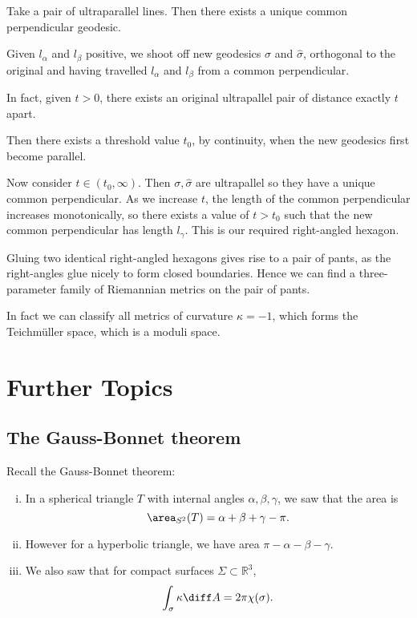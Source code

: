 \documentclass[12pt]{article}
\begin{document}
\begin{proofbox}
	Take a pair of ultraparallel lines. Then there exists a unique common perpendicular geodesic.

	Given $l_\alpha$ and $l_\beta$ positive, we shoot off new geodesics $\sigma$ and $\hat \sigma$, orthogonal to the original and having travelled $l_\alpha$ and $l_\beta$ from a common perpendicular.

	In fact, given $t > 0$, there exists an original ultrapallel pair of distance exactly $t$ apart.

	Then there exists a threshold value $t_0$, by continuity, when the new geodesics first become parallel.

	Now consider $t \in (t_0, \infty)$. Then $\sigma, \hat \sigma$ are ultrapallel so they have a unique common perpendicular. As we increase $t$, the length of the common perpendicular increases monotonically, so there exists a value of $t > t_0$ such that the new common perpendicular has length $l_\gamma$. This is our required right-angled hexagon.
\end{proofbox}

Gluing two identical right-angled hexagons gives rise to a pair of pants, as the right-angles glue nicely to form closed boundaries. Hence we can find a three-parameter family of Riemannian metrics on the pair of pants.

In fact we can classify all metrics of curvature $\kappa = -1$, which forms the Teichm\"{u}ller space, which is a moduli space.


\newpage

\section{Further Topics}
\label{sec:further_topics}

\subsection{The Gauss-Bonnet theorem}
\label{sub:the_gauss_bonnet_theorem}

Recall the Gauss-Bonnet theorem:
\begin{enumerate}[(i)]
	\item In a spherical triangle $T$ with internal angles $\alpha, \beta, \gamma$, we saw that the area is
		\[
			\area_{S^2}(T) = \alpha + \beta + \gamma - \pi.
		\]
	\item However for a hyperbolic triangle, we have area $\pi - \alpha - \beta - \gamma$.
	\item We also saw that for compact surfaces $\Sigma \subset \mathbb{R}^3$,
		\[
		\int_\sigma \kappa \diff A = 2 \pi \chi(\sigma).
		\]
\end{enumerate}
\end{document}
